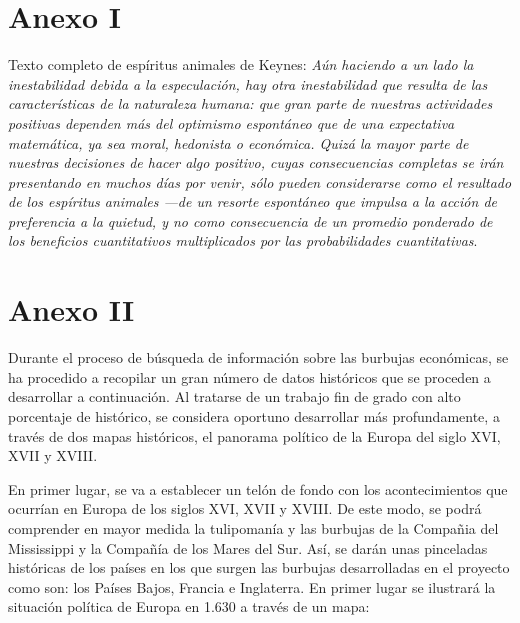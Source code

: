 \chapter{Anexo I}

Texto completo de espíritus animales de Keynes:
\emph{Aún haciendo a un lado la inestabilidad debida a la especulación, hay otra inestabilidad que resulta de las características de la naturaleza humana: que gran parte de nuestras actividades positivas dependen más del optimismo espontáneo que de una expectativa matemática, ya sea moral, hedonista o económica. Quizá la mayor parte de nuestras decisiones de hacer algo positivo, cuyas consecuencias completas se irán presentando en muchos días por venir, sólo pueden considerarse como el resultado de los espíritus animales —de un resorte espontáneo que impulsa a la acción de preferencia a la quietud, y no como consecuencia de un promedio ponderado de los beneficios cuantitativos multiplicados por las probabilidades cuantitativas}.

\chapter{Anexo II}

Durante el proceso de búsqueda de información sobre las burbujas económicas, se ha procedido a recopilar un gran número de datos históricos que se proceden a desarrollar a continuación. Al tratarse de un trabajo fin de grado con alto porcentaje de histórico, se considera oportuno desarrollar más profundamente, a través de dos mapas históricos, el panorama político de la Europa del siglo XVI, XVII y XVIII. 

En primer lugar, se va a establecer un telón de fondo con los acontecimientos que ocurrían en Europa de los siglos XVI, XVII y XVIII. De este modo, se podrá comprender en mayor medida la tulipomanía y las burbujas de la Compañia del Mississippi y la Compañía de los Mares del Sur. Así, se darán unas pinceladas históricas de los países en los que surgen las burbujas desarrolladas en el proyecto como son: los Países Bajos, Francia e Inglaterra.
En primer lugar se ilustrará la situación política de Europa en 1.630 a través de un mapa:

